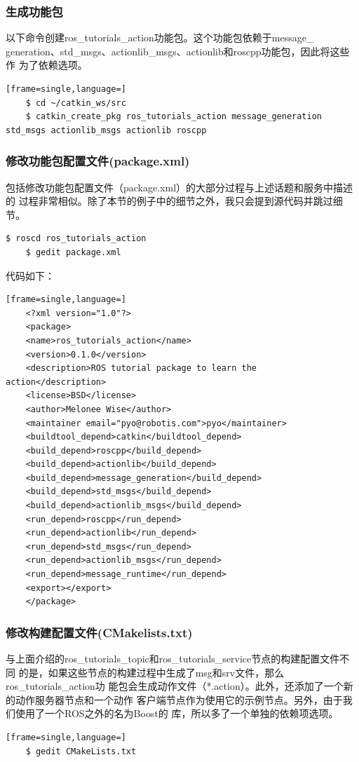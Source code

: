 \documentclass[geye,green,kindle,cn]{elegantnote}
\begin{document}
\subsubsection{生成功能包}
以下命令创建ros_tutorials_action功能包。这个功能包依赖于message_ generation、std_msgs、actionlib_msgs、actionlib和roscpp功能包，因此将这些作 为了依赖选项。
\begin{lstlisting}[frame=single,language=]
    $ cd ~/catkin_ws/src 
    $ catkin_create_pkg ros_tutorials_action message_generation std_msgs actionlib_msgs actionlib roscpp 
\end{lstlisting}
\subsubsection{修改功能包配置文件(package.xml)}
包括修改功能包配置文件（package.xml）的大部分过程与上述话题和服务中描述的 过程非常相似。除了本节的例子中的细节之外，我只会提到源代码并跳过细节。 
\begin{lstlisting}[frame=single,language=xml]
    $ roscd ros_tutorials_action 
    $ gedit package.xml 
\end{lstlisting}

代码如下：
\begin{lstlisting}[frame=single,language=]
    <?xml version="1.0"?> 
    <package>  
    <name>ros_tutorials_action</name>  
    <version>0.1.0</version>  
    <description>ROS tutorial package to learn the action</description>  
    <license>BSD</license>  
    <author>Melonee Wise</author>  
    <maintainer email="pyo@robotis.com">pyo</maintainer>  
    <buildtool_depend>catkin</buildtool_depend>  
    <build_depend>roscpp</build_depend>  
    <build_depend>actionlib</build_depend>  
    <build_depend>message_generation</build_depend>  
    <build_depend>std_msgs</build_depend>  
    <build_depend>actionlib_msgs</build_depend>  
    <run_depend>roscpp</run_depend>  
    <run_depend>actionlib</run_depend>  
    <run_depend>std_msgs</run_depend>  
    <run_depend>actionlib_msgs</run_depend>  
    <run_depend>message_runtime</run_depend>  
    <export></export> 
    </package> 
\end{lstlisting}
\subsubsection{修改构建配置文件(CMakelists.txt)}
与上面介绍的ros_tutorials_topic和ros_tutorials_service节点的构建配置文件不同 的是，如果这些节点的构建过程中生成了msg和srv文件，那么ros_tutorials_action功 能包会生成动作文件（*.action）。此外，还添加了一个新的动作服务器节点和一个动作 客户端节点作为使用它的示例节点。另外，由于我们使用了一个ROS之外的名为Boost的 库，所以多了一个单独的依赖项选项。 
\begin{lstlisting}[frame=single,language=]
    $ gedit CMakeLists.txt 
\end{lstlisting}
\end{document}
